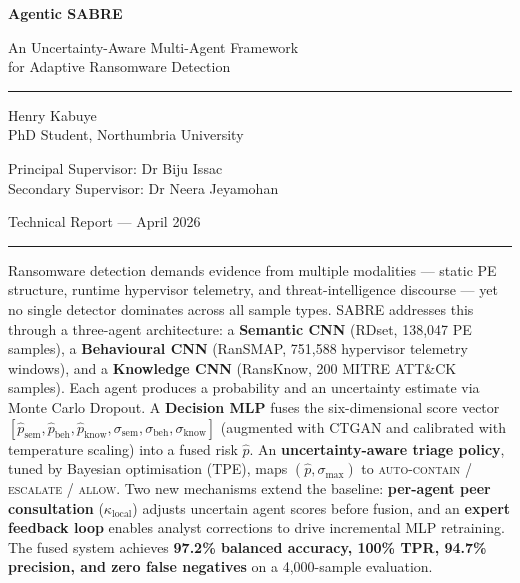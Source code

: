 \documentclass[12pt,a4paper]{article}
\begin{document}
\begin{titlepage}
  \centering
  \vspace*{1.5cm}
  {\Huge\bfseries\color{navy} Agentic SABRE\par}
  \vspace{0.6cm}
  {\large\color{sblue}
    An Uncertainty-Aware Multi-Agent Framework\\
    for Adaptive Ransomware Detection\par}
  \vspace{1.2cm}
  \rule{\textwidth}{1.5pt}
  \vspace{0.8cm}
  {\large Henry Kabuye\\
  PhD Student, Northumbria University\par}
  \vspace{0.4cm}
  {\normalsize
    Principal Supervisor: Dr Biju Issac\\
    Secondary Supervisor: Dr Neera Jeyamohan\par}
  \vspace{0.8cm}
  {\normalsize Technical Report — April 2026\par}
  \vspace{1.5cm}
  \rule{\textwidth}{1.5pt}
  \vspace{1.0cm}
  \begin{tcolorbox}[keybox, title=Abstract]
    \small
    Ransomware detection demands evidence from multiple modalities — static PE
    structure, runtime hypervisor telemetry, and threat-intelligence discourse — yet
    no single detector dominates across all sample types. SABRE addresses this through
    a three-agent architecture: a \textbf{Semantic CNN} (RDset, 138,047 PE samples), a
    \textbf{Behavioural CNN} (RanSMAP, 751,588 hypervisor telemetry windows), and a
    \textbf{Knowledge CNN} (RansKnow, 200 MITRE ATT\&CK samples). Each agent produces
    a probability and an uncertainty estimate via Monte Carlo Dropout. A \textbf{Decision
    MLP} fuses the six-dimensional score vector
    $[\hat{p}_{\text{sem}},\hat{p}_{\text{beh}},\hat{p}_{\text{know}},
      \sigma_{\text{sem}},\sigma_{\text{beh}},\sigma_{\text{know}}]$
    (augmented with CTGAN and calibrated with temperature scaling) into a fused risk
    $\hat{p}$. An \textbf{uncertainty-aware triage policy}, tuned by Bayesian
    optimisation (TPE), maps $(\hat{p}, \sigma_{\max})$ to
    \textsc{auto-contain} / \textsc{escalate} / \textsc{allow}. Two new
    mechanisms extend the baseline: \textbf{per-agent peer consultation}
    ($\kappa_{\text{local}}$) adjusts uncertain agent scores before fusion, and an
    \textbf{expert feedback loop} enables analyst corrections to drive incremental MLP
    retraining. The fused system achieves \textbf{97.2\% balanced accuracy, 100\% TPR,
    94.7\% precision, and zero false negatives} on a 4,000-sample evaluation.
  \end{tcolorbox}
\end{titlepage}
\end{document}
